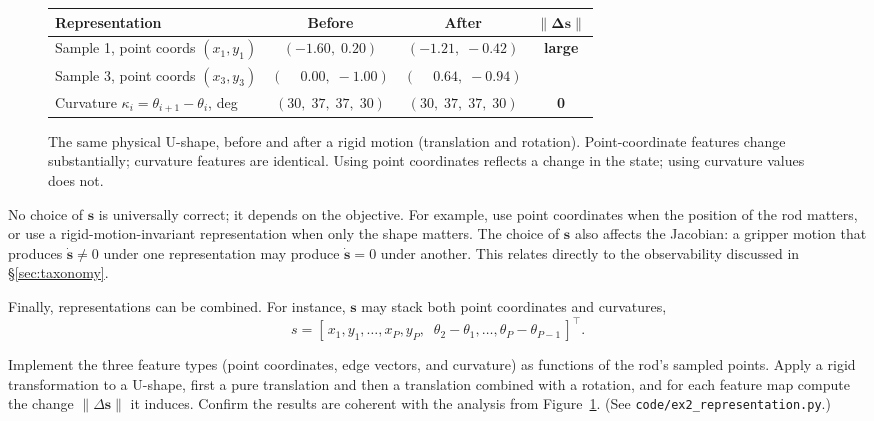 \documentclass[11pt,a4paper]{article}
\begin{document}
\begin{figure}[h!]
\vspace{0.4em}
\renewcommand{\arraystretch}{1.35}
\begin{tabular}{@{} l c c c @{}}
\toprule
\textbf{Representation} & \textbf{Before} & \textbf{After} & $\bm{\|\Delta\mathbf{s}\|}$ \\
\midrule
Sample 1, point coords $(x_1,y_1)$
& $(-1.60,\;0.20)$
& $(-1.21,\;-0.42)$
& \multirow{2}{*}{\textcolor{Cat1Red}{\textbf{large}}} \\
Sample 3, point coords $(x_3,y_3)$
& $(\phantom{-}0.00,\;-1.00)$
& $(\phantom{-}0.64,\;-0.94)$
& \\
\midrule
Curvature $\kappa_i=\theta_{i+1}-\theta_i$, deg
& $(30,\;37,\;37,\;30)$
& $(30,\;37,\;37,\;30)$
& \textcolor{TargetGreen!50!black}{\textbf{0}} \\
\bottomrule
\end{tabular}
\caption{The same physical U-shape, before and after a rigid motion (translation and
rotation). Point-coordinate features change substantially; curvature features are
identical. Using point coordinates reflects a change in the state;  using curvature values does not.}
\label{fig:u-shape-verdict}
\end{figure}

No choice of $\mathbf{s}$ is universally correct; it depends on the objective. For example, use point
coordinates when the position of the rod matters, or use a rigid-motion-invariant
representation when only the shape matters. The choice of $\mathbf{s}$ also affects the Jacobian:
a gripper motion that produces $\dot{\mathbf{s}} \neq 0$ under one representation may produce
$\dot{\mathbf{s}} = 0$ under another. This relates directly to the observability discussed in
\S\ref{sec:taxonomy}.

Finally, representations can be combined. For instance, $\mathbf{s}$ may stack both point
coordinates and curvatures,
\[
    s=[\,x_1,y_1,\dots,x_P,y_P,\;\; \theta_{2}-\theta_1,\dots,\theta_{P}-\theta_{P-1}\,]^{\top}.
\]

\begin{labexercise}[Exercise~2]
Implement the three feature types (point coordinates, edge vectors, and curvature) as
functions of the rod's sampled points. Apply a rigid transformation to a U-shape, first a pure
translation and then a translation combined with a rotation, and for each feature map
compute the change $\|\Delta\mathbf{s}\|$ it induces. Confirm the results are coherent with the analysis from
Figure~\ref{fig:u-shape-verdict}.
(See \texttt{code/ex2\_representation.py}.)
\end{labexercise}
\end{document}
